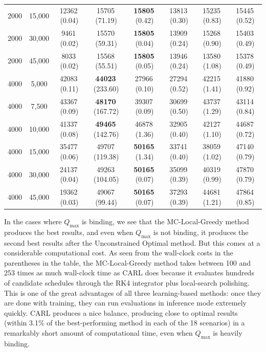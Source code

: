 \documentclass[mnsc,sglanonrev]{informs4}
\begin{document}
\begin{table}[ht]
{\begin{tabular}{cc||ccc|ccc}
2000 & 15{,}000 & 12362\,(0.04) & 15705\,(71.19) & \textbf{15805}\,(0.42) & 13813\,(0.30) & 15235\,(0.83) & 15445\,(0.52) \\
2000 & 30{,}000 & 9461\,(0.02) & 15570\,(59.31) & \textbf{15805}\,(0.04) & 13909\,(0.24) & 15268\,(0.90) & 15403\,(0.49) \\
2000 & 45{,}000 & 8033\,(0.02) & 15568\,(55.51) & \textbf{15805}\,(0.05) & 13946\,(0.24) & 13580\,(1.08) & 15378\,(0.49) \\ \hline
4000 & 5{,}000 & 42083\,(0.11) & \textbf{44023}\,(233.60) & 27966\,(0.10) & 27294\,(0.52) & 42215\,(1.41) & 41880\,(0.92) \\
4000 & 7{,}500 & 43367\,(0.09) & \textbf{48170}\,(167.72) & 39307\,(0.09) & 30699\,(0.50) & 43737\,(1.29) & 43114\,(0.84) \\
4000 & 10{,}000 & 41337\,(0.08) & \textbf{49465}\,(142.76) & 46878\,(1.36) & 32905\,(0.40) & 42127\,(1.10) & 44687\,(0.72) \\
4000 & 15{,}000 & 35477\,(0.06) & 49707\,(119.38) & \textbf{50165}\,(1.34) & 33741\,(0.40) & 38059\,(1.02) & 47140\,(0.79) \\
4000 & 30{,}000 & 24137\,(0.04) & 49263\,(104.05) & \textbf{50165}\,(0.07) & 35099\,(0.39) & 40319\,(0.99) & 47870\,(0.79) \\
4000 & 45{,}000 & 19362\,(0.03) & 49067\,(99.44) & \textbf{50165}\,(0.07) & 37293\,(0.39) & 44681\,(1.21) & 47864\,(0.85) \\
\bottomrule
\end{tabular}%
}
\end{table}

In the cases where $Q_{\max}$ is binding, we see that the MC-Local-Greedy method produces the best results, and even when $Q_{\max}$ is not binding, it produces the second best results after the Unconstrained Optimal method. But this comes at a considerable computational cost. As seen from the wall-clock costs in the parentheses in the table, the MC-Local-Greedy method takes between 100 and 253 times as much wall-clock time as CARL does because it evaluates hundreds of candidate schedules through the RK4 integrator plus local-search polishing. This is one of the great advantages of all three learning-based methods: once they are done with training, they can run evaluations in inference mode extremely quickly. CARL produces a nice balance, producing close to optimal results (within 3.1\% of the best-performing method in each of the 18 scenarios) in a remarkably short amount of computational time, even when $Q_{\max}$ is heavily binding.
\end{document}
